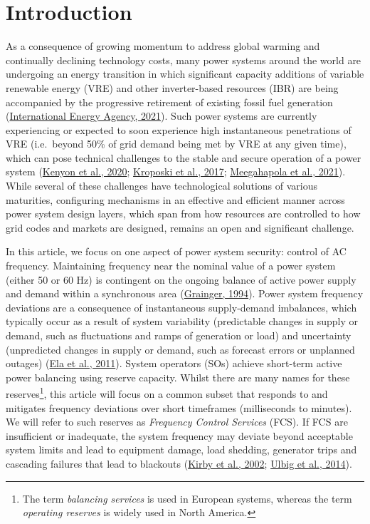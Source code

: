 \documentclass[12pt,a4paper,]{report}
\begin{document}
\hypertarget{sec:fcs-intro}{%
\section{Introduction}\label{sec:fcs-intro}}

As a consequence of growing momentum to address global warming and
continually declining technology costs, many power systems around the
world are undergoing an energy transition in which significant capacity
additions of variable renewable energy (VRE) and other inverter-based
resources (IBR) are being accompanied by the progressive retirement of
existing fossil fuel generation
(\protect\hyperlink{ref-internationalenergyagencyNetZero20502021}{International
Energy Agency, 2021}). Such power systems are currently experiencing or
expected to soon experience high instantaneous penetrations of VRE
(i.e.~beyond 50\% of grid demand being met by VRE at any given time),
which can pose technical challenges to the stable and secure operation
of a power system
(\protect\hyperlink{ref-kenyonStabilityControlPower2020}{Kenyon et al.,
2020};
\protect\hyperlink{ref-kroposkiAchieving100Renewable2017}{Kroposki et
al., 2017};
\protect\hyperlink{ref-meegahapolaPowerSystemStability2021}{Meegahapola
et al., 2021}). While several of these challenges have technological
solutions of various maturities, configuring mechanisms in an effective
and efficient manner across power system design layers, which span from
how resources are controlled to how grid codes and markets are designed,
remains an open and significant challenge.

In this article, we focus on one aspect of power system security:
control of AC frequency. Maintaining frequency near the nominal value of
a power system (either 50 or 60 Hz) is contingent on the ongoing balance
of active power supply and demand within a synchronous area
(\protect\hyperlink{ref-graingerPowerSystemAnalysis1994}{Grainger,
1994}). Power system frequency deviations are a consequence of
instantaneous supply-demand imbalances, which typically occur as a
result of system variability (predictable changes in supply or demand,
such as fluctuations and ramps of generation or load) and uncertainty
(unpredicted changes in supply or demand, such as forecast errors or
unplanned outages)
(\protect\hyperlink{ref-elaOperatingReservesVariable2011}{Ela et al.,
2011}). System operators (SOs) achieve short-term active power balancing
using reserve capacity. Whilst there are many names for these
reserves\footnote{The term \emph{balancing services} is used in European
  systems, whereas the term \emph{operating reserves} is widely used in
  North America.}, this article will focus on a common subset that
responds to and mitigates frequency deviations over short timeframes
(milliseconds to minutes). We will refer to such reserves as
\emph{Frequency Control Services} (FCS). If FCS are insufficient or
inadequate, the system frequency may deviate beyond acceptable system
limits and lead to equipment damage, load shedding, generator trips and
cascading failures that lead to blackouts
(\protect\hyperlink{ref-kirbyFrequencyControlConcerns2002}{Kirby et al.,
2002}; \protect\hyperlink{ref-ulbigImpactLowRotational2014}{Ulbig et
al., 2014}).
\end{document}
